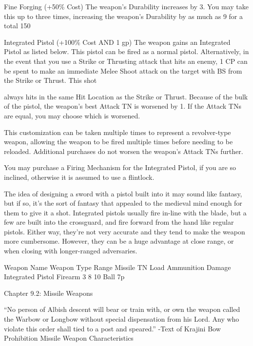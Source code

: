\documentclass[oneside,11pt,english]{book}
\begin{document}
 

Fine Forging (+50\% Cost) 
The weapon’s Durability increases by 3. You may take this up to three times, increasing the weapon’s 
Durability by as much as 9 for a total 150%

 

Integrated Pistol (+100\% Cost AND 1 gp) 
The weapon gains an Integrated Pistol as listed below. This pistol can be fired as a normal pistol. 
Alternatively, in the event that you use a Strike or Thrusting attack that hits an enemy, 1 CP can be spent 
to make an immediate Melee Shoot attack on the target with BS from the Strike or Thrust. This shot 


always hits in the same Hit Location as the Strike or Thrust. Because of the bulk of the pistol, the 
weapon’s best Attack TN is worsened by 1. If the Attack TNs are equal, you may choose which is 
worsened. 

 

This customization can be taken multiple times to represent a revolver-type weapon, allowing the weapon 
to be fired multiple times before needing to be reloaded. Additional purchases do not worsen the 
weapon’s Attack TNs further. 

 

You may purchase a Firing Mechanism for the Integrated Pistol, if you are so inclined, otherwise it is 
assumed to use a flintlock. 

 

The idea of designing a sword with a pistol built into it may sound like fantasy, but if so, it’s the sort of 
fantasy that appealed to the medieval mind enough for them to give it a shot. Integrated pistols usually 
fire in-line with the blade, but a few are built into the crossguard, and fire forward from the hand like 
regular pistols. Either way, they’re not very accurate and they tend to make the weapon more 
cumbersome. However, they can be a huge advantage at close range, or when closing with longer-ranged 
adversaries. 

 

Weapon Name Weapon Type Range Missile TN Load Ammunition Damage 
Integrated Pistol Firearm 3 8 10 Ball 7p 

 

Chapter 9.2: Missile Weapons 

 

“No person of Albish descent will bear or train with, or own the weapon called the Warbow or Longbow 
without special dispensation from his Lord. Any who violate this order shall tied to a post and speared.” 
-Text of Krajini Bow Prohibition 
Missile Weapon Characteristics 
\end{document}
